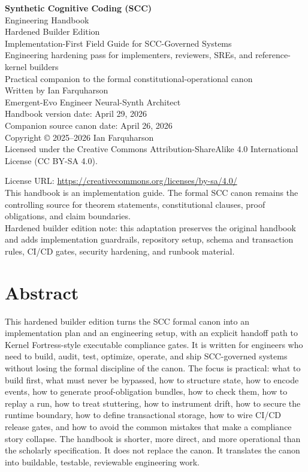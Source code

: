 \documentclass[11pt,oneside]{article}
\begin{document}
\begin{titlepage}
\centering
{\Huge\bfseries Synthetic Cognitive Coding (SCC)\\[0.35em]}
{\LARGE Engineering Handbook\\[0.25em]}
{\Large Hardened Builder Edition\\[0.25em]}
{\Large Implementation-First Field Guide for SCC-Governed Systems\\[0.55em]}
{\normalsize Engineering hardening pass for implementers, reviewers, SREs, and reference-kernel builders}\\[1.1em]
{\large Practical companion to the formal constitutional-operational canon}\\[1.6em]
{\large Written by Ian Farquharson}\\[0.25em]
{\normalsize Emergent-Evo Engineer \textbar{} Neural-Synth Architect}\\[1.2em]
\vfill
{\large Handbook version date: April 29, 2026}\\[0.5em]
{\normalsize Companion source canon date: April 26, 2026}\\[1em]
{\normalsize Copyright \copyright{} 2025--2026 Ian Farquharson}\\[0.5em]
{\normalsize Licensed under the Creative Commons Attribution-ShareAlike 4.0 International License (CC BY-SA 4.0).}\par
{\normalsize License URL: \url{https://creativecommons.org/licenses/by-sa/4.0/}}\\[1em]
{\small This handbook is an implementation guide. The formal SCC canon remains the controlling source for theorem statements, constitutional clauses, proof obligations, and claim boundaries.}\\[0.6em]
{\small Hardened builder edition note: this adaptation preserves the original handbook and adds implementation guardrails, repository setup, schema and transaction rules, CI/CD gates, security hardening, and runbook material.}
\end{titlepage}

\section*{Abstract}
This hardened builder edition turns the SCC formal canon into an implementation plan and an engineering setup, with an explicit handoff path to Kernel Fortress-style executable compliance gates. It is written for engineers who need to build, audit, test, optimize, operate, and ship SCC-governed systems without losing the formal discipline of the canon. The focus is practical: what to build first, what must never be bypassed, how to structure state, how to encode events, how to generate proof-obligation bundles, how to check them, how to replay a run, how to treat stuttering, how to instrument drift, how to secure the runtime boundary, how to define transactional storage, how to wire CI/CD release gates, and how to avoid the common mistakes that make a compliance story collapse. The handbook is shorter, more direct, and more operational than the scholarly specification. It does not replace the canon. It translates the canon into buildable, testable, reviewable engineering work.
\end{document}
